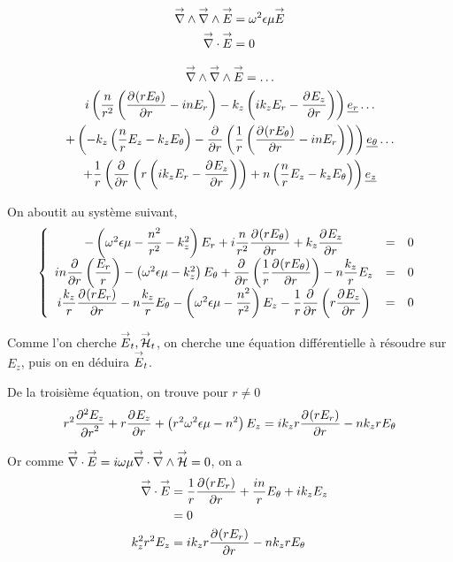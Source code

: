 \begin{align}
    \vrot \vrot \vE &= \w^2\eps\mu \vE
    \\
    \vdiv \vE &= 0
\end{align}

\begin{multline}
    \vrot \vrot \vE = \dots\\
    i\left(\frac{n}{r^2}\left(\ddr{r}{(rE_\theta)} - inE_r\right) - k_z\left(ik_zE_r - \ddr{r}{E_z}\right)\right)    \v{e_r} \dots\\ 
    + \left(-k_z\left(\frac{n}{r}E_z - k_zE_\theta\right) -\ddr{r}{}\left(\frac{1}{r}\left(\ddr{r}{(rE_\theta)}-inE_r\right)\right)\right)    \v{e_\theta} \dots\\
    + \frac{1}{r}\left(\ddr{r}{} \left(r\left(ik_zE_r - \ddr{r}{E_z}\right)\right) + n \left(\frac{n}{r}E_z - k_zE_\theta\right)\right) \v{e_z}
\end{multline}

On aboutit au système suivant,
\begin{equation}
    \left\lbrace
    \begin{array}{ccc}
        -\left(\w^2\eps\mu -\frac{n^2}{r^2}  - k_z^2\right)E_r  +i\frac{n}{r^2}\ddr{r}{(rE_\theta)}  +k_z\ddr{r}{E_z} & = & 0\\
        in\ddr{r}{}\left(\frac{E_r}{r}\right) -\left(\w^2\eps\mu - k_z^2\right)E_\theta + \ddr{r}{}\left(\frac{1}{r}\ddr{r}{(rE_\theta)}\right)  - n\frac{k_z}{r}E_z & = & 0\\
        i\frac{k_z}{r}\ddr{r}{(rE_r)}  - n\frac{k_z}{r}E_\theta  -\left(\w^2\eps\mu - \frac{n^2}{r^2} \right)E_z - \frac{1}{r}\ddr{r}{}\left(r\ddr{r}{E_z}\right) & = & 0
    \end{array}
    \right.
\end{equation}

Comme l'on cherche $\vE_t, \vH_t$, on cherche une équation différentielle à résoudre sur $E_z$, puis on en déduira $\vE_t$.

De la troisième  équation, on trouve pour $r\not=0$
\begin{equation}
r^2 \ddr[2]{r}{E_z} + r\ddr{r}{E_z} + \left(r^2\w^2\eps\mu - n^2\right)E_z =ik_zr\ddr{r}{(rE_r)} -  nk_zrE_\theta
\end{equation}


Or comme $\vdiv \vE = i\w\mu\vdiv\vrot\vH = 0$, on a
\begin{align}
    \vdiv\vE &= \frac{1}{r}\ddr{r}{(rE_r)} + \frac{in}{r}E_\theta + ik_zE_z
    \\
    &=0
    \\
    k_z^2r^2 E_z &= ik_zr\ddr{r}{(rE_r)} - nk_zrE_\theta
\end{align}

